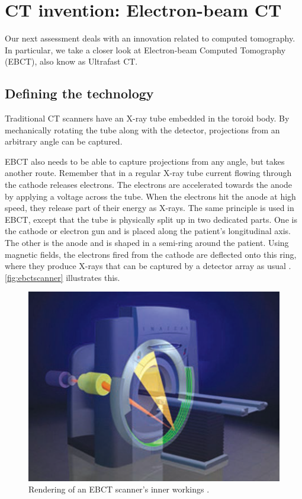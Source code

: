 \section{CT invention: Electron-beam CT} %
Our next assessment deals with an innovation related to computed tomography. In
particular, we take a closer look at Electron-beam Computed Tomography (EBCT),
also know as Ultrafast CT.

\subsection{Defining the technology}
Traditional CT scanners have an X-ray tube embedded in the toroid body. By
mechanically rotating the tube along with the detector, projections from an
arbitrary angle can be captured.

EBCT also needs to be able to capture projections from any angle, but takes
another route. Remember that in a regular X-ray tube current flowing through the
cathode releases electrons. The electrons are accelerated towards the anode by
applying a voltage across the tube. When the electrons hit the anode at high
speed, they release part of their energy as X-rays. The same principle is used
in EBCT, except that the tube is physically split up in two dedicated parts. One
is the cathode or electron gun and is placed along the patient's longitudinal
axis. The other is the anode and is shaped in a semi-ring around the patient.
Using magnetic fields, the electrons fired from the cathode are deflected onto this
ring, where they produce X-rays that can be captured by a detector array as
usual \cite{suetens}. \autoref{fig:ebctscanner} illustrates this.

\begin{figure}[ht]
\begin{center}
  \includegraphics[width=\linewidth]{img/EBCT.png}
  \caption{Rendering of an EBCT scanner's inner workings \cite{suetens}.}
  \label{fig:ebctscanner}
\end{center}
\end{figure}

